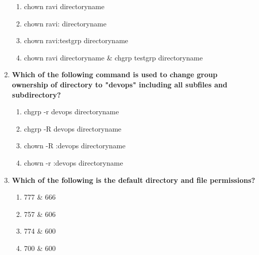 \begin{flushleft}
\begin{enumerate}
\begin{enumerate}[label=(\alph*)]
			\item chown ravi directoryname
			\item chown ravi: directoryname
			\item chown ravi:testgrp directoryname  %
			\item chown ravi directoryname \& chgrp testgrp directoryname %
		\end{enumerate}
		\bigskip
		\bigskip
		\item \textbf{Which of the following command is used to change group ownership of directory to "devops" including all subfiles and subdirectory?}
		\begin{enumerate}[label=(\alph*)]
			\item chgrp -r devops directoryname  
			\item chgrp -R devops directoryname  %
			\item chown -R :devops directoryname  %
			\item chown -r :devops directoryname
		\end{enumerate}
		\bigskip
		\bigskip
		\item \textbf{Which of the following is the default directory and file permissions?}
		\begin{enumerate}[label=(\alph*)]
			\item 777  \&  666   %
			\item 757  \&  606
			\item 774  \&  600
			\item 700  \&  600
		\end{enumerate}
	\end{enumerate}
	
	
\end{flushleft}
\newpage


\afterpage{\blankpage}